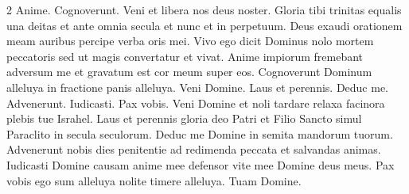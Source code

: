 \begin{multicols*}{2}
 Anime.
 Cognoverunt.
 Veni et libera nos deus noster.
 Gloria tibi trinitas equalis una deitas et ante omnia secula et nunc et in perpetuum.
 Deus exaudi orationem meam auribus percipe verba oris mei.
 Vivo ego dicit Dominus nolo mortem peccatoris sed ut magis convertatur et vivat.
 Anime impiorum fremebant adversum me et gravatum est cor meum super eos.
 Cognoverunt Dominum alleluya in fractione panis alleluya.
 Veni Domine.
 Laus et perennis.
 Deduc me.
 Advenerunt.
 Iudicasti.
 Pax vobis.
 Veni Domine et noli tardare relaxa facinora plebis tue Israhel.
 Laus et perennis gloria deo Patri et Filio Sancto simul Paraclito in secula seculorum.
 Deduc me Domine in semita mandorum tuorum.
 Advenerunt nobis dies penitentie ad redimenda peccata et salvandas animas.
 Iudicasti Domine causam anime mee defensor vite mee Domine deus meus.
 Pax vobis ego sum alleluya nolite timere alleluya.
 Tuam Domine.

\end{multicols*}
